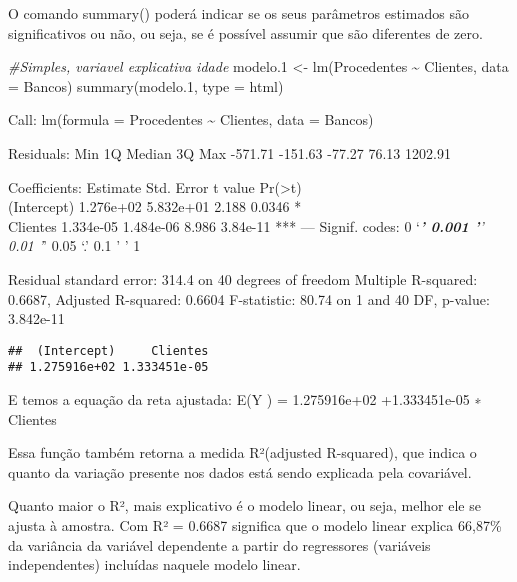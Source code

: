 \documentclass[
]{article}
\newenvironment{Shaded}{\begin{snugshade}}{\end{snugshade}}
\newcommand{\AttributeTok}[1]{\textcolor[rgb]{0.77,0.63,0.00}{#1}}
\newcommand{\CommentTok}[1]{\textcolor[rgb]{0.56,0.35,0.01}{\textit{#1}}}
\newcommand{\FloatTok}[1]{\textcolor[rgb]{0.00,0.00,0.81}{#1}}
\newcommand{\FunctionTok}[1]{\textcolor[rgb]{0.00,0.00,0.00}{#1}}
\newcommand{\NormalTok}[1]{#1}
\newcommand{\OtherTok}[1]{\textcolor[rgb]{0.56,0.35,0.01}{#1}}
\newcommand{\SpecialCharTok}[1]{\textcolor[rgb]{0.00,0.00,0.00}{#1}}
\newcommand{\StringTok}[1]{\textcolor[rgb]{0.31,0.60,0.02}{#1}}
\begin{document}
O comando summary() poderá indicar se os seus parâmetros estimados são
significativos ou não, ou seja, se é possível assumir que são diferentes
de zero.

\begin{Shaded}
\begin{Highlighting}[]
\CommentTok{\#Simples, variavel explicativa idade}
\NormalTok{modelo}\FloatTok{.1} \OtherTok{\textless{}{-}} \FunctionTok{lm}\NormalTok{(Procedentes }\SpecialCharTok{\textasciitilde{}}\NormalTok{ Clientes, }\AttributeTok{data =}\NormalTok{ Bancos)}
\FunctionTok{summary}\NormalTok{(modelo}\FloatTok{.1}\NormalTok{, }\AttributeTok{type =} \StringTok{\textquotesingle{}html\textquotesingle{}}\NormalTok{)}
\end{Highlighting}
\end{Shaded}

Call: lm(formula = Procedentes \textasciitilde{} Clientes, data =
Bancos)

Residuals: Min 1Q Median 3Q Max -571.71 -151.63 -77.27 76.13 1202.91

Coefficients: Estimate Std. Error t value
Pr(\textgreater\textbar t\textbar)\\
(Intercept) 1.276e+02 5.832e+01 2.188 0.0346 *\\
Clientes 1.334e-05 1.484e-06 8.986 3.84e-11 *** --- Signif. codes: 0
`\emph{\textbf{' 0.001 '}' 0.01 '}' 0.05 `.' 0.1 ' ' 1

Residual standard error: 314.4 on 40 degrees of freedom Multiple
R-squared: 0.6687, Adjusted R-squared: 0.6604 F-statistic: 80.74 on 1
and 40 DF, p-value: 3.842e-11

\begin{Shaded}
\end{Shaded}

\begin{verbatim}
##  (Intercept)     Clientes 
## 1.275916e+02 1.333451e-05
\end{verbatim}

E temos a equação da reta ajustada: E(Y ) = 1.275916e+02 +1.333451e-05 ∗
Clientes

Essa função também retorna a medida R²(adjusted R-squared), que indica o
quanto da variação presente nos dados está sendo explicada pela
covariável.

Quanto maior o R², mais explicativo é o modelo linear, ou seja, melhor
ele se ajusta à amostra. Com R² = 0.6687 significa que o modelo linear
explica 66,87\% da variância da variável dependente a partir do
regressores (variáveis independentes) incluídas naquele modelo linear.
\end{document}
